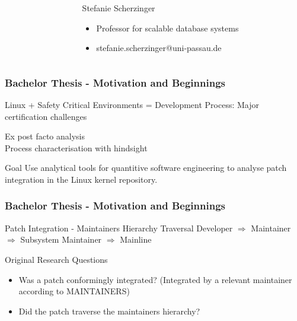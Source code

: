 \documentclass{beamer}
\begin{document}
\begin{frame}
\begin{minipage}[c]{1.0\linewidth}
\begin{columns}
\begin{column}{0.35\textwidth}
\begin{center}
			\end{center}
		\end{column}
		\begin{column}{0.7\textwidth}
		\begin{block}{Stefanie Scherzinger}
			\begin{itemize}
				\item Professor for scalable database systems
				\item stefanie.scherzinger@uni-passau.de
			\end{itemize}
		\end{block}
		\end{column}
		\end{columns}
	\end{minipage}
	\end{frame}

	\begin{frame}
	\frametitle{Bachelor Thesis - Motivation and Beginnings}
		\begin{block}{Linux + Safety Critical Environments}
			= Development Process: Major certification challenges
		\end{block}
		\Rightarrow Ex post facto analysis\\ %
		\Rightarrow Process characterisation with hindsight

		\begin{alertblock}{Goal}
			Use analytical tools for quantitive software engineering to analyse patch integration in the Linux kernel repository. %
		\end{alertblock}
	\end{frame}


	\begin{frame}
	\frametitle{Bachelor Thesis - Motivation and Beginnings}
		\begin{block}{Patch Integration - Maintainers Hierarchy Traversal}
			Developer $\Rightarrow$ Maintainer $\Rightarrow$ Subsystem Maintainer $\Rightarrow$ Mainline
		\end{block}
		\begin{block}{Original Research Questions}
			\begin{itemize}
				\item Was a patch conformingly integrated? (Integrated by a relevant maintainer according to MAINTAINERS)
				\item Did the patch traverse the maintainers hierarchy?
			\end{itemize}
		\end{block}
	\end{frame}
\end{document}
